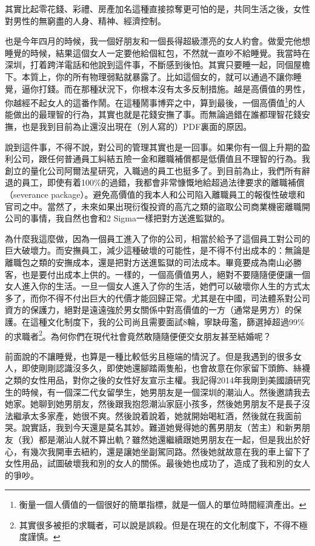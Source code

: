其實比起零花錢、彩禮、房產加名這種直接掠奪更可怕的是，共同生活之後，女性對男性的無窮盡的人身、精神、經濟控制。

也是今年四月的時候，我一個好朋友和一個長得超級漂亮的女人約會。做愛完他想睡覺的時候，結果這個女人一定要他給個紅包，不然就一直吵不給睡覺。我當時在深圳，打着跨洋電話和他說到這件事，不斷感到後怕。其實只要睡一起，同個屋檐下。本質上，你的所有物理弱點就暴露了。比如這個女的，就可以通過不讓你睡覺，逼你打錢。而在那種狀況下，你根本沒有太多反制措施。越是高價值的男性，你越經不起女人的這番作鬧。在這種鬧事博弈之中，算到最後，一個高價值\footnote{衡量一個人價值的一個很好的簡單指標，就是一個人的單位時間經濟產出。}的人能做出的最理智的行為，其實也就是花錢安撫了事。而無論過錯在誰都理智花錢安撫，也是我到目前為止還沒出現在（別人寫的）PDF裏面的原因。

說到這件事，不得不說，對公司的管理其實也是一回事。如果你有一個上升期的盈利公司，跟任何普通員工糾結五險一金和離職補償都是低價值且不理智的行為。我創立的量化公司阿爾法星研究，入職過的員工也挺多了。到目前為止，我們所有辭退的員工，即使有着100\%的過錯，我都會非常慷慨地給超過法律要求的離職補償（severance package）。避免高價值的我本人和公司陷入離職員工的報復性破壞和官司之中。當然了，未來如果出現衍復投資的高亢之類的盜取公司商業機密離職開公司的事情，我自然也會和2 Sigma一樣把對方送進監獄的。

為什麼我這麼做，因為一個員工進入了你的公司，相當於給予了這個員工對公司的巨大破壞力。而安撫員工，減少這種破壞的可能性，是不得不付出成本的：無論是離職包之類的安撫成本，還是把對方送進監獄的司法成本。畢竟要成為南山必勝客，也是要付出成本上供的。一樣的，一個高價值男人，絕對不要隨隨便便讓一個女人進入你的生活。一旦一個女人進入了你的生活，她們可以破壞你人生的方式太多了，而你不得不付出巨大的代價才能回歸正常。尤其是在中國，司法體系對公司資方的保護力，絕對是遠遠強於男女關係中對高價值的一方（通常是男方）的保護。在這種文化制度下，我的公司尚且需要面試8輪，寧缺毋濫，篩選掉超過99\%的求職者\footnote{其實很多被拒的求職者，可以說是誤殺。但是在現在的文化制度下，不得不極度謹慎。}。為何你們在現代社會竟然敢隨隨便便交女朋友甚至結婚呢？

前面說的不讓睡覺，也算是一種比較低劣且極端的情況了。但是我遇到的很多女人，即使剛剛認識沒多久，即使她還腳踏兩隻船，也會故意在你家留下頭飾、絲襪之類的女性用品，對你之後的女性好友宣示主權。我記得2014年我剛到美國讀研究生的時候，有一個深二代女留學生，她男朋友是一個深圳的潮汕人。然後邀請我去她家。她聊到她男朋友，然後跟我抱怨潮汕家庭小孩多，然後她男朋友不是長子沒法繼承太多家產，她很不爽。然後說着說着，她就開始喝紅酒，然後就在我面前哭。說實話，我到今天還是莫名其妙。難道她覺得她的舊男朋友（苦主）和新男朋友（我）都是潮汕人就不算出軌？雖然她還繼續跟她男朋友在一起，但是我出於好心，有幾次我開車去紐約，還是讓她坐副駕同路。然後她就故意在我的車上留下了女性用品，試圖破壞我和別的女人的關係。最後她也成功了，造成了我和別的女人的爭吵。

